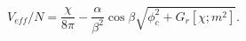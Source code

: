 \begin{equation}
V_{eff}/N  = \frac{\chi}{8 \pi} - \frac {\alpha} {\beta^2} \cos \beta
\sqrt{\phi_c^2 + G_r[\chi;m^2]}.
\end{equation}

